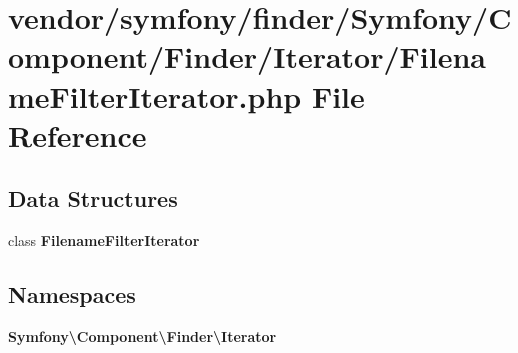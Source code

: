 \section{vendor/symfony/finder/\+Symfony/\+Component/\+Finder/\+Iterator/\+Filename\+Filter\+Iterator.php File Reference}
\label{_filename_filter_iterator_8php}
\subsection*{Data Structures}
\begin{DoxyCompactItemize}
\item 
class {\bf Filename\+Filter\+Iterator}
\end{DoxyCompactItemize}
\subsection*{Namespaces}
\begin{DoxyCompactItemize}
\item 
 {\bf Symfony\textbackslash{}\+Component\textbackslash{}\+Finder\textbackslash{}\+Iterator}
\end{DoxyCompactItemize}
